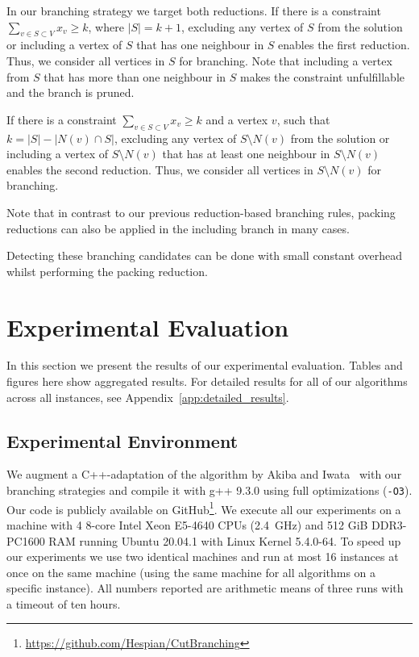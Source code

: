 \documentclass[a4paper,UKenglish,cleveref, autoref, thm-restate]{lipics-v2021}
\begin{document}
In our branching strategy we target both reductions. If there is a constraint $\sum_{v\in S\subset V}x_v\geq k$, where $|S| = k + 1$, excluding any vertex of $S$ from the solution or including a vertex of $S$ that has one neighbour in $S$ enables the first reduction. Thus, we consider all vertices in $S$ for branching. Note that including a vertex from $S$ that has more than one neighbour in $S$ makes the constraint unfulfillable and the branch is pruned.

If there is a constraint $\sum_{v\in S\subset V}x_v\geq k$ and a vertex $v$, such that $k = |S|-|N(v)\cap S|$, excluding any vertex of $S\setminus N(v)$ from the solution or including a vertex of $S\setminus N(v)$ that has at least one neighbour in $S\setminus N(v)$ enables the second reduction. Thus, we consider all vertices in $S\setminus N(v)$ for branching.

Note that in contrast to our previous reduction-based branching rules, packing
reductions can also be applied in the including branch in many cases.

Detecting these branching candidates can be done with small constant overhead whilst performing the packing reduction.


\section{Experimental Evaluation}

In this section we present the results of our experimental evaluation. Tables
and figures here show aggregated results. For
detailed results for all of our algorithms across all instances, see Appendix~\ref{app:detailed_results}.

\subsection{Experimental Environment}
We augment a C++-adaptation of the algorithm by Akiba and
Iwata~\cite{AkibaIwata} with our branching strategies and compile it
with g++ 9.3.0 using full optimizations (\texttt{-O3}). Our
code is publicly available on GitHub\footnote{\url{https://github.com/Hespian/CutBranching}}. We execute all our experiments on a machine with 4 8-core Intel Xeon E5-4640 CPUs
(2.4~GHz) and 512 GiB DDR3-PC1600 RAM running Ubuntu 20.04.1 with Linux Kernel 5.4.0-64. To speed up our experiments we use two
identical machines and run at most 16 instances at once on the
same machine (using the same machine for all algorithms on a specific instance).
All numbers reported are arithmetic means of three runs with a timeout of ten
hours.
\end{document}
